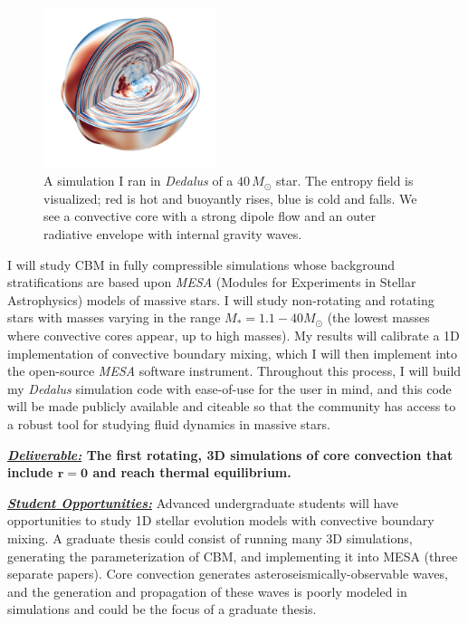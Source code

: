 \documentclass[12pt]{article}
\begin{document}
\begin{figure}
  \begin{center}
      \vspace{-1.6cm}
    \includegraphics[width=0.45\textwidth]{dedalus_massive_star.png}
      \vspace{-1.3cm}
  \end{center}
    \caption{A simulation I ran in \emph{Dedalus} of a {$40 \,M_{\odot}$} star. 
    The entropy field is visualized; red is hot and buoyantly rises, blue is cold and falls. 
    We see a convective core with a strong dipole flow and an outer radiative envelope with internal gravity waves. \label{fig:star}}
    \vspace{-0.5cm}
\end{figure}
I will study CBM in fully compressible simulations whose background stratifications are based upon \emph{MESA} (Modules for Experiments in Stellar Astrophysics) models of massive stars.
I will study non-rotating and rotating stars with masses varying in the range $M_* = 1.1-40 M_{\odot}$ (the lowest masses where convective cores appear, up to high masses).
My results will calibrate a 1D implementation of convective boundary mixing, which I will then implement into the open-source \emph{MESA} software instrument.
Throughout this process, I will build my \emph{Dedalus} simulation code with ease-of-use for the user in mind, and this code will be made publicly available and citeable so that the community has access to a robust tool for studying fluid dynamics in massive stars.


\textbf{\underline{\emph{Deliverable:}} The first rotating, 3D simulations of core convection that include $\boldsymbol{r = 0}$ and reach thermal equilibrium.}

\textbf{\underline{\emph{Student Opportunities:}}} Advanced undergraduate students will have opportunities to study 1D stellar evolution models with convective boundary mixing.
A graduate thesis could consist of running many 3D simulations, generating the parameterization of CBM, and implementing it into MESA (three separate papers).
Core convection generates asteroseismically-observable waves, and the generation and propagation of these waves is poorly modeled in simulations and could be the focus of a graduate thesis.
\end{document}
